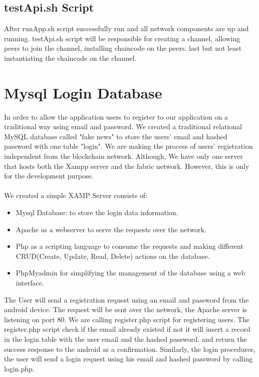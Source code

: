 \subsection{testApi.sh Script }

After runApp.sh script successfully run and all network components are up and running. testApi.sh script will be responsible for creating a channel, allowing peers to join the channel, installing chaincode on the peers. last but not least instantiating the chaincode on the channel.
\cleardoublepage

\section{Mysql Login Database} 
In order to allow the application users to register to our application on a traditional way using email and password. We created a traditional relational MySQL database called "fake news" to store the users' email and hashed password with one table "login". 
We are making the process of users' registration independent from the blockchain network.
Although, We have only one server that hosts both the Xampp server and the fabric network. However, this is only for the development purpose. \\
\ \\ 
We created a simple XAMP Server consists of: 
\begin{itemize}
   \item Mysql Database: to store the login data information. 
   \item Apache as a webserver to serve the requests over the network. 
   \item Php as a scripting language to consume the requests and making different CRUD(Create, Update, Read, Delete) actions on the database.
   \item PhpMyadmin for simplifying the management of the database using a web interface. 
\end{itemize}  
\bigskip
The User will send a registration request using an email and password from the android device.  The request will be sent over the network, the Apache server is listening on port 80. We are calling register.php script for registering users. The register.php script check if the email already existed if not it will insert a record in the login table with the user email and the hashed password. and return the success response to the android as a confirmation. 
Similarly,  the login procedures, the user will send a login request using his email and hashed password by calling login.php. \\ 
